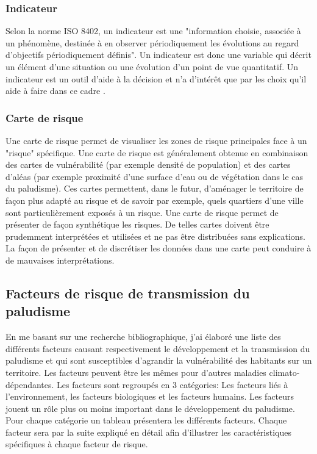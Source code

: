 \subsubsection{Indicateur}

Selon la norme ISO 8402, un indicateur est une "information choisie, associée à un phénomène, destinée à en observer périodiquement les évolutions au regard d'objectifs périodiquement définis". Un indicateur est donc une variable qui décrit un élément d'une situation ou une évolution d'un point de vue quantitatif. Un indicateur est un outil d'aide à la décision et n'a d'intérêt que par les choix qu'il aide à faire dans ce cadre \citep{ANAES2012}. 



\subsubsection{Carte de risque}

Une carte de risque permet de visualiser les zones de risque principales face à un "risque" spécifique. Une carte de risque est généralement obtenue en combinaison des cartes de vulnérabilité (par exemple densité de population) et des cartes d'aléas (par exemple proximité d'une surface d'eau ou de végétation dans le cas du paludisme). Ces cartes permettent, dans le futur, d'aménager le territoire de façon plus adapté au risque et de savoir par exemple, quels quartiers d'une ville sont particulièrement exposés à un risque. Une carte de risque permet de présenter de façon synthétique les risques. De telles cartes doivent être prudemment interprétées et utilisées et ne pas être distribuées sans explications. La façon de présenter et de discrétiser les données dans une carte peut conduire à de mauvaises interprétations.


\subsection{Facteurs de risque de transmission du paludisme}

En me basant sur une recherche bibliographique, j'ai élaboré une liste des différents facteurs causant respectivement le développement et la transmission du paludisme et qui sont susceptibles d'agrandir la vulnérabilité des habitants sur un territoire. Les facteurs peuvent être les mêmes pour d'autres maladies climato-dépendantes. Les facteurs sont regroupés en 3 catégories: Les facteurs liés à l'environnement, les facteurs biologiques et les facteurs humains. Les facteurs jouent un rôle plus ou moins important dans le développement du paludisme. Pour chaque catégorie un tableau présentera les différents facteurs. Chaque facteur sera par la suite expliqué en détail afin d'illustrer les caractéristiques spécifiques à chaque facteur de risque.

